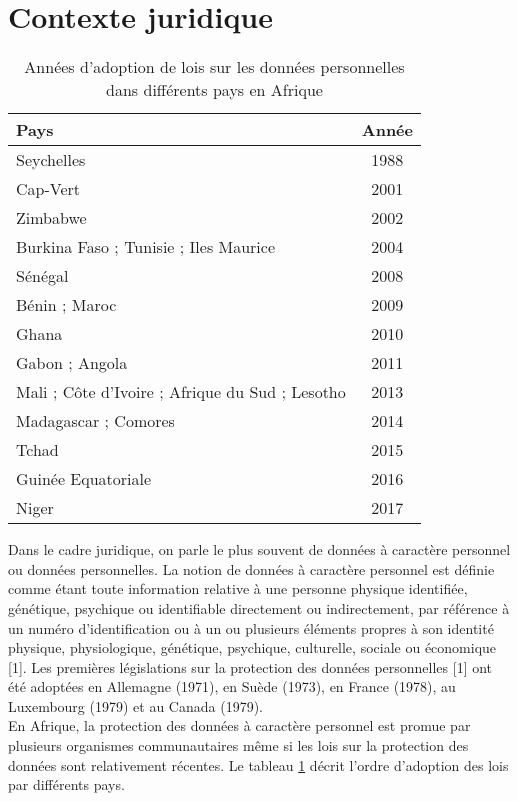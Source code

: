 \section{Contexte juridique}
\begin{table}[hbt!]
	\centering
	\begin{tabular}{| l | c |} 
		\hline
		Pays & Année \\ [0.5ex] 
		\hline
		Seychelles & 1988 \\ 
		\hline
		Cap-Vert & 2001 \\
		\hline
		Zimbabwe & 2002 \\
		\hline
		Burkina Faso ; Tunisie ; Iles Maurice & 2004 \\
		\hline
		Sénégal & 2008 \\
		\hline
		Bénin ; Maroc & 2009 \\
		\hline
		Ghana & 2010 \\
		\hline
		Gabon ; Angola & 2011 \\
		\hline
		Mali ; Côte d’Ivoire ; Afrique du Sud ; Lesotho & 2013 \\
		\hline
		Madagascar ; Comores & 2014 \\
		\hline
		Tchad & 2015 \\
		\hline
		Guinée Equatoriale & 2016 \\
		\hline
		Niger & 2017 \\ [1ex] 
		\hline
	\end{tabular}
	\caption{Années d'adoption de lois sur les données personnelles dans différents pays en Afrique}
	\label{table:5.1}
\end{table}
Dans le cadre juridique, on parle le plus souvent de données à caractère personnel ou données personnelles. La notion de données à caractère personnel est définie comme étant toute information relative à une personne physique identifiée, génétique, psychique ou identifiable directement ou indirectement, par référence à un numéro d’identification ou à un ou plusieurs éléments propres à son identité physique, physiologique, génétique, psychique, culturelle, sociale ou économique [1].
Les premières législations sur la protection des données personnelles [1] ont été adoptées en Allemagne (1971), en Suède (1973), en France (1978), au Luxembourg (1979) et au Canada (1979).\\
En Afrique, la protection des données à caractère personnel est promue par plusieurs organismes communautaires même si les lois sur la protection des données sont relativement récentes. Le tableau \ref{table:5.1} décrit l’ordre d’adoption des lois par différents pays.\\
